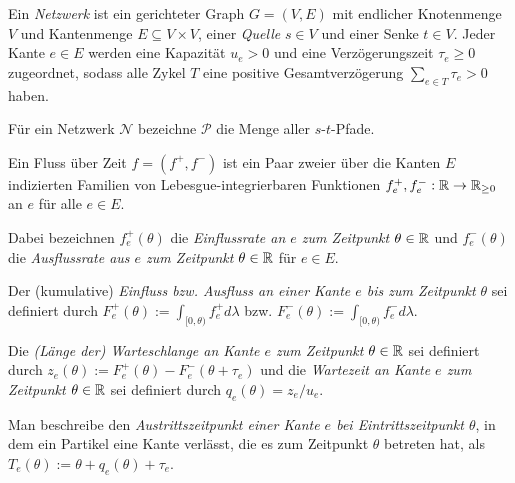 \begin{definition}[Netzwerk]
	Ein \emph{Netzwerk} ist ein gerichteter Graph $G=(V,E)$ mit endlicher Knotenmenge $V$ und Kantenmenge $E\subseteq V\times V$, einer \emph{Quelle} $s\in V$ und einer Senke $t\in V$.
	Jeder Kante $e\in E$ werden eine Kapazität $u_e > 0$ und eine Verzögerungszeit $\tau_e\geq 0$ zugeordnet, sodass alle Zykel $T$ eine positive Gesamtverzögerung $\sum_{e\in T}\tau_e > 0$ haben.
\end{definition}

Für ein Netzwerk $\mathcal{N}$ bezeichne $\mathcal{P}$ die Menge aller $s$-$t$-Pfade.

\begin{definition}
	Ein Fluss über Zeit $f=(f^+, f^-)$ ist ein Paar zweier über die Kanten $E$ indizierten Familien von Lebesgue-integrierbaren Funktionen $f^+_e,f^-_e: \mathbb{R} \to \mathbb{R}_{\geq 0}$ an $e$ für alle $e\in E$.
	
	Dabei bezeichnen $f_e^+(\theta)$ die \emph{Einflussrate an $e$ zum Zeitpunkt $\theta\in\mathbb{R}$} und $f_e^-(\theta)$ die \emph{Ausflussrate aus $e$ zum Zeitpunkt $\theta\in\mathbb{R}$} für $e\in E$.
	
	Der (kumulative) \emph{Einfluss bzw. Ausfluss an einer Kante $e$ bis zum Zeitpunkt $\theta$} sei definiert durch $F^+_e(\theta):=\int_{[0,\theta)} f^+_e d\lambda$ bzw. $F^-_e(\theta):=\int_{[0,\theta)} f^-_e d\lambda$.
	
	Die \emph{(Länge der) Warteschlange an Kante $e$ zum Zeitpunkt $\theta\in\mathbb{R}$} sei definiert durch $z_e(\theta):= F_e^+(\theta) - F_e^-(\theta + \tau_e)$ und die \emph{Wartezeit an Kante $e$ zum Zeitpunkt $\theta\in\mathbb{R}$} sei definiert durch $q_e(\theta) = z_e / u_e$.
	
	Man beschreibe den \emph{Austrittszeitpunkt einer Kante $e$ bei Eintrittszeitpunkt $\theta$}, in dem ein Partikel eine Kante verlässt, die es zum Zeitpunkt $\theta$ betreten hat, als $T_e(\theta):=\theta + q_e(\theta) + \tau_e$.
\end{definition}

